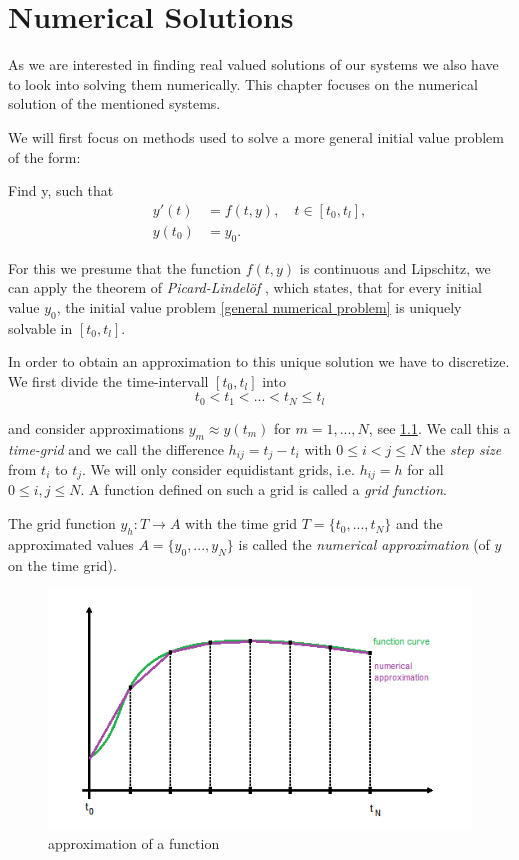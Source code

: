 \chapter{Numerical Solutions}
As we are interested in finding real valued solutions of our systems we also have to look into solving them numerically. This chapter focuses on the numerical solution of the mentioned systems.

We will first focus on methods used to solve a more general initial value problem of the form:

Find y, such that
\begin{equation}
	\begin{aligned}
		y'(t) &= f(t,y), \quad t \in [t_0, t_l], \\
		y(t_0) &= y_0.
	\end{aligned}
	\label{general numerical problem}
\end{equation}

For this we presume that the function $f(t,y)$ is continuous and Lipschitz, we can apply the theorem of \emph{Picard-Lindelöf} , which states, that for every initial value $y_0$, the initial value problem \eqref{general numerical problem} is uniquely solvable in $[t_0, t_l]$.

In order to obtain an approximation to this unique solution we have to discretize. We first divide the time-intervall $[t_0, t_l]$ into
\begin{displaymath}
	t_0 < t_1 < ... < t_N \leq t_l
\end{displaymath}

and consider approximations $y_m \approx y(t_m)$ for $m=1,...,N$, see \ref{fig:numerical approximation}. We call this a \emph{time-grid} and we call the difference $h_{ij} = t_j - t_i$ with $0 \leq i < j \leq N$ the \emph{step size} from $t_i$ to $t_j$. We will only consider equidistant grids, i.e. $h_{ij} = h$ for all $0 \leq i,j \leq N$. A function defined on such a grid is called a \emph{grid function}.

The grid function $y_h : T \to A$ with the time grid $T=\{t_0, ..., t_N\}$ and the approximated values $A = \{y_0, ..., y_N\}$ is called the \emph{numerical approximation} (of $y$ on the time grid).
\begin{figure}[H]
	\centering
	\includegraphics[scale=0.7]{pictures/num_approx.png}
	\caption{approximation of a function}
	\label{fig:numerical approximation}
\end{figure}

